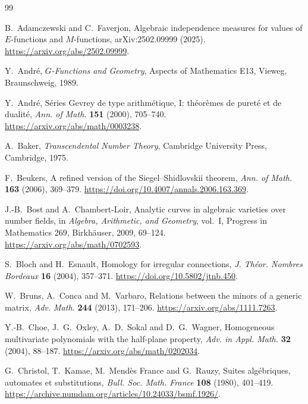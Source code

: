 \documentclass[11pt]{article}
\theoremstyle{definition}
\theoremstyle{remark}
\begin{document}
\begin{thebibliography}{99}
\small

B.~Adamczewski and C.~Faverjon,
\newblock Algebraic independence measures for values of $E$-functions and
$M$-functions,
\newblock arXiv:2502.09999 (2025).
\newblock \url{https://arxiv.org/abs/2502.09999}.

Y.~Andr\'e,
\newblock \emph{$G$-Functions and Geometry},
\newblock Aspects of Mathematics E13, Vieweg, Braunschweig, 1989.

Y.~Andr\'e,
\newblock S\'eries Gevrey de type arithm\'etique, I: th\'eor\`emes de puret\'e et de dualit\'e,
\newblock \emph{Ann. of Math.} \textbf{151} (2000), 705--740.
\newblock \url{https://arxiv.org/abs/math/0003238}.

A.~Baker,
\newblock \emph{Transcendental Number Theory},
\newblock Cambridge University Press, Cambridge, 1975.

F.~Beukers,
\newblock A refined version of the Siegel--Shidlovskii theorem,
\newblock \emph{Ann. of Math.} \textbf{163} (2006), 369--379.
\newblock \url{https://doi.org/10.4007/annals.2006.163.369}.

J.-B.~Bost and A.~Chambert-Loir,
\newblock Analytic curves in algebraic varieties over number fields,
\newblock in \emph{Algebra, Arithmetic, and Geometry}, vol.~I,
Progress in Mathematics 269, Birkh\"auser, 2009, 69--124.
\newblock \url{https://arxiv.org/abs/math/0702593}.

S.~Bloch and H.~Esnault,
\newblock Homology for irregular connections,
\newblock \emph{J. Th\'eor. Nombres Bordeaux} \textbf{16} (2004), 357--371.
\newblock \url{https://doi.org/10.5802/jtnb.450}.

W.~Bruns, A.~Conca and M.~Varbaro,
\newblock Relations between the minors of a generic matrix,
\newblock \emph{Adv. Math.} \textbf{244} (2013), 171--206.
\newblock \url{https://arxiv.org/abs/1111.7263}.

Y.-B.~Choe, J.~G.~Oxley, A.~D.~Sokal and D.~G.~Wagner,
\newblock Homogeneous multivariate polynomials with the half-plane property,
\newblock \emph{Adv. in Appl. Math.} \textbf{32} (2004), 88--187.
\newblock \url{https://arxiv.org/abs/math/0202034}.

G.~Christol, T.~Kamae, M.~Mend\`es France and G.~Rauzy,
\newblock Suites alg\'ebriques, automates et substitutions,
\newblock \emph{Bull. Soc. Math. France} \textbf{108} (1980), 401--419.
\newblock \url{https://archive.numdam.org/articles/10.24033/bsmf.1926/}.


\end{thebibliography}
\end{document}
